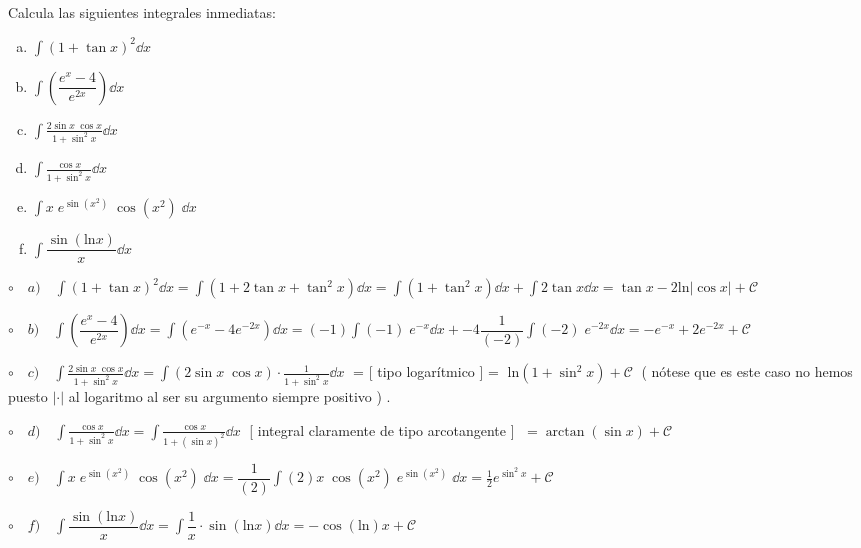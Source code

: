 \begin{ejre} Calcula las siguientes integrales inmediatas:
\begin{multicols}{2}
\begin{enumerate}[a) ]
	\item $\displaystyle \int (1+\tan x)^2 \dd x$
	\item $\displaystyle \int \left( \dfrac {e^x-4}{e^{2x}}\right) \dd x$
	\item $ \displaystyle \int \frac {2 \sin x \; \cos x}{1+\sin^2 x} \dd x$
	\item $\displaystyle \int \frac {\cos x}{1+\sin^2 x} \dd x$
	\item $\displaystyle \int x\; e^{\sin (x^2)}\; \cos (x^2)\; \dd x$
	\item $\displaystyle \int \dfrac {\sin(\mathrm{ln}x)}{x} \dd x$
\end{enumerate}	
\end{multicols}
\end{ejre}
	
\begin{proofw}\renewcommand{\qedsymbol}{$\diamond$}	

	$\circ \quad a) \quad \displaystyle \int (1+\tan x)^2 \dd x = \displaystyle \int (1+2\tan x +\tan^2 x) \dd x= \displaystyle \int (1 +\tan^2 x) \dd x + \displaystyle \int 2\tan x  \dd x = \tan x - 2 \mathrm{ln}|\cos x|+ \mathcal C$


 	\hspace{-7mm} $\circ \quad b) \quad \displaystyle \int \left( \dfrac {e^x-4}{e^{2x}}\right) \dd x= \displaystyle \int (e^{-x} -4e^{-2x})   \dd x=\displaystyle (-1) \int (-1)\; e^{-x}    \dd x+\displaystyle -4  \dfrac {1}{(-2)} \int (-2)\; e^{-2x}    \dd x = -e^{-x} +2 e^{-2x}+\mathcal C$
	
 	\hspace{-7mm} $\circ \quad c) \quad \displaystyle \int \frac {2 \sin x \; \cos x}{1+\sin^2 x} \dd x= \displaystyle \int (2 \sin x \; \cos x)\cdot  \frac {1}{1+\sin^2 x} \dd x \; $ = \small{[ tipo logarítmico ]} \normalsize{=} $\;  \mathrm{ln} (1+\sin^2 x) +\mathcal C\; $ \small{( nótese que es este caso no hemos puesto $|\cdot|$ al logaritmo al ser su argumento siempre positivo )} \normalsize{.}
	
 	\hspace{-7mm} $\circ \quad d) \quad \displaystyle \int \frac {\cos x}{1+\sin^2 x} \dd x= \displaystyle \int \frac {\cos x}{1+(\sin x)^2} \dd x\; $ \small{ [ integral claramente de tipo arcotangente ] } \normalsize{$\; =  \arctan (\sin x) + \mathcal C$}
	
 	\hspace{-7mm} $\circ \quad e) \quad \displaystyle \int x\; e^{\sin (x^2)}\; \cos (x^2)\; \dd x= \displaystyle \dfrac {1}{(2)} \int (2) x\; \cos (x^2)\;  e^{\sin (x^2)} \; \dd x =\frac 1 2  e^{\sin^2 x}+ \mathcal C$
	
	   \hspace{-7mm} $\circ \quad f) \quad \displaystyle \int \dfrac {\sin(\mathrm{ln}x)}{x} \dd x = \displaystyle \int \dfrac 1 x \cdot \sin(\mathrm{ln}x) \dd x = - \cos(\mathrm{ln})x + \mathcal C$
\end{proofw}

